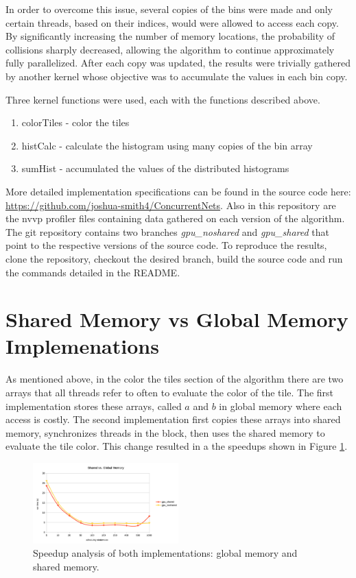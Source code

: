 \documentclass[journal]{IEEEtran}
\begin{document}
In order to overcome this issue, several copies of the bins were made and only certain threads, based on their indices, would were allowed to access each copy. By significantly increasing the number of memory locations, the probability of collisions sharply decreased, allowing the algorithm to continue approximately fully parallelized. After each copy was updated, the results were trivially gathered by another kernel whose objective was to accumulate the values in each bin copy.

Three kernel functions were used, each with the functions described above.
\begin{enumerate}
  \item colorTiles - color the tiles
  \item histCalc - calculate the histogram using many copies of the bin array
  \item sumHist - accumulated the values of the distributed histograms
\end{enumerate}

More detailed implementation specifications can be found in the source code here: \url{https://github.com/joshua-smith4/ConcurrentNets}. Also in this repository are the nvvp profiler files containing data gathered on each version of the algorithm. The git repository contains two branches \emph{gpu_noshared} and \emph{gpu_shared} that point to the respective versions of the source code. To reproduce the results, clone the repository, checkout the desired branch, build the source code and run the commands detailed in the README.

\section{Shared Memory vs Global Memory Implemenations}

As mentioned above, in the color the tiles section of the algorithm there are two arrays that all threads refer to often to evaluate the color of the tile. The first implementation stores these arrays, called $a$ and $b$ in global memory where each access is costly. The second implementation first copies these arrays into shared memory, synchronizes threads in the block, then uses the shared memory to evaluate the tile color. This change resulted in a the speedups shown in Figure \ref{fig:globalvshared}.

\begin{figure}[ht]
\centering
\includegraphics[width=0.5\textwidth]{global_vs_shared}
\caption{Speedup analysis of both implementations: global memory and shared memory.}
\label{fig:globalvshared}
\end{figure}
\end{document}
